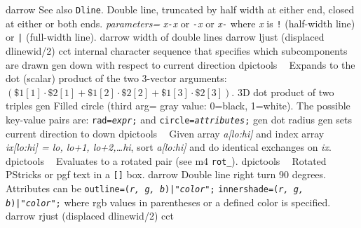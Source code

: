   {darrow}%
  {See also {\tt Dline}.
   Double line, truncated by half width at either end, closed
    at either or both ends.
   {\sl parameters=}%
      {\sl x}{\tt -}{\sl x} or
      {\tt -}{\sl x} or
      {\sl x}{\tt -} where {\sl x} is {\tt !} (half-width line)
       or {\tt |} (full-width line).}%
%
  {darrow}%
  {width of double lines}%
%
  {darrow}%
  {ljust (displaced dlinewid/2)}%
%
  {cct}%
  {internal character sequence that specifies which subcomponents are drawn}%
%
  {gen}%
  {down with respect to current direction}%
%
  {dpictools}%
  {$\;\;$ Expands to the dot (scalar) product of the two 3-vector arguments:
   $(\${}1[1]\cdot\${}2[1] + \${}1[2]\cdot\${}2[2] + \${}1[3]\cdot\${}2[3])$.}%
%
  {3D}%
  {dot product of two triples}%
%
  {gen}%
  {Filled circle (third arg= gray value: 0=black, 1=white). The possible
   key-value pairs are:
    {\tt rad={\sl expr};} and
    {\tt circle={\sl attributes};} }%
%
  {gen}%
  {dot radius}%
%
  {gen}%
  {sets current direction to down }%
%
  {dpictools}%
  {$\;\;$ Given array {\sl a[lo:hi]} and index array {\sl ix[lo:hi] =
    lo, lo+1, lo+2,\ldots hi}, sort {\sl a[lo:hi]} and do identical exchanges
    on {\sl ix}.}%
%
  {dpictools}%
  {$\;\;$ Evaluates to a rotated pair (see m4 {\tt rot\_}).}%
%
  {dpictools}%
  {$\;\;$ Rotated PStricks or pgf text in a {\tt []} box.}%
%
  {darrow}%
  {Double line right turn 90 degrees.  Attributes can be
    {\tt outline=({\sl r, g, b})|"{\sl color}";}%
    {\tt innershade=({\sl r, g, b})|"{\sl color}";}%
    where rgb values in parentheses or a defined color is specified.}%
%
  {darrow}%
  {rjust (displaced dlinewid/2)}%
%
  {cct}%
